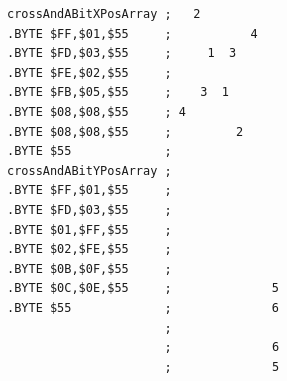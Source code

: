 \begin{minipage}[b]{0.48\linewidth}
\begin{lrbox}{\mybox}%
\begin{lstlisting}[basicstyle=\ttfamily\tiny,escapechar=\%]
crossAndABitXPosArray ;   2           
.BYTE $FF,$01,$55     ;           4   
.BYTE $FD,$03,$55     ;     1  3      
.BYTE $FE,$02,$55     ;               
.BYTE $FB,$05,$55     ;    3  1       
.BYTE $08,$08,$55     ; 4             
.BYTE $08,$08,$55     ;         2     
.BYTE $55             ;               
crossAndABitYPosArray ;               
.BYTE $FF,$01,$55     ;               
.BYTE $FD,$03,$55     ;               
.BYTE $01,$FF,$55     ;               
.BYTE $02,$FE,$55     ;               
.BYTE $0B,$0F,$55     ;               
.BYTE $0C,$0E,$55     ;              5
.BYTE $55             ;              6
                      ;               
                      ;              6
                      ;              5
\end{lstlisting}
\end{lrbox}%
\scalebox{0.8}{\usebox{\mybox}}

\end{minipage}
%
